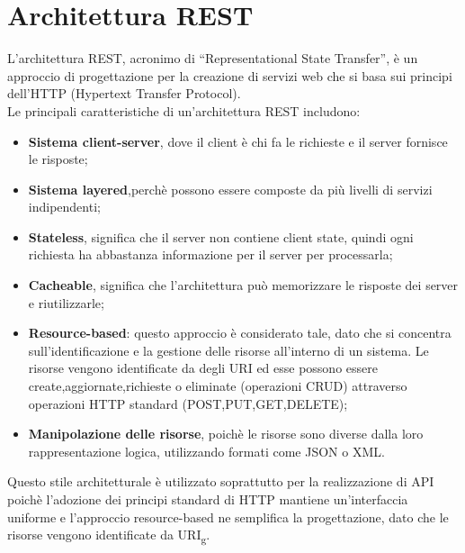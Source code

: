\section{Architettura REST}
L’architettura REST, acronimo di “Representational State Transfer”, è un approccio di progettazione per la creazione di servizi web che si basa sui principi dell’HTTP (Hypertext Transfer Protocol).\\
Le principali caratteristiche di un’architettura REST includono:
\begin{itemize}
\item \textbf{Sistema client-server}, dove il client è chi fa le richieste e il server fornisce le risposte;
\item \textbf{Sistema layered},perchè possono essere composte da più livelli di servizi indipendenti;
\item \textbf{Stateless}, significa che il server non contiene client state, quindi ogni richiesta ha abbastanza informazione per il server per processarla;
\item \textbf{Cacheable}, significa che l’architettura può memorizzare le risposte dei server e riutilizzarle;
\item \textbf{Resource-based}: questo approccio è considerato tale, dato che si concentra sull’identificazione e la gestione delle risorse all’interno di un sistema. Le risorse vengono identificate da degli URI ed esse possono essere create,aggiornate,richieste o eliminate (operazioni CRUD) attraverso operazioni HTTP standard (POST,PUT,GET,DELETE);
\item \textbf{Manipolazione delle risorse}, poichè le risorse sono diverse dalla loro rappresentazione logica, utilizzando formati come JSON o XML.
\end{itemize}
Questo stile architetturale è utilizzato soprattutto per la realizzazione di API poichè l'adozione dei principi standard di HTTP mantiene un'interfaccia uniforme e l'approccio resource-based ne semplifica la progettazione, dato che le risorse vengono identificate da URI\textsubscript{g}.

